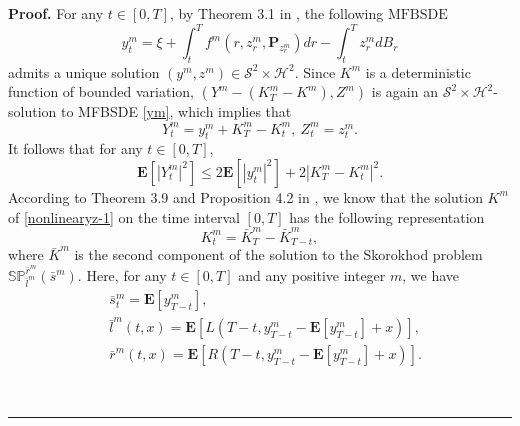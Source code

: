 \documentclass[10pt]{article}%
\numberwithin{equation}{section}
\newenvironment{proof}[1][Proof]{\noindent \textbf{#1.} }{\  \rule{0.5em}{0.5em}}
\def \E{\mathbf{E}}
\def \P{\mathbf{P}}
\begin{document}
\begin{proof}
 For any $t\in[0,T]$, by Theorem 3.1 in \cite{BLP}, the following $\text{MFBSDE}$
 \begin{equation*}\label{ym}
  y_t^m=\xi+\int_{t}^{T} f^m(r,z^m_r,\P_{z^m_r})dr- \int_{t}^{T}z_r^mdB_r 
 \end{equation*}
 admits a unique solution $(y^{m},z^{m})\in \mathcal{S}^2\times\mathcal{H}^2$. 
 Since $K^m$ is a deterministic function of bounded variation, $\left(Y^m-(K^m_{T}-K^m), Z^m\right)$ is again an $\mathcal{S}^2\times\mathcal{H}^2$-solution to MFBSDE \eqref{ym}, which implies that
 \begin{equation}\label{YmZm}
   Y_{t}^{m}=y_{t}^{m}+K_{T}^{m}-K_{t}^{m},\ Z_t^{m}=z_t^{m}.%
 \end{equation}
 It follows that for any $t\in[0,T]$, 
 \begin{equation}\label{Ymym}
  \mathbf{E}[\left|Y_{t}^{m}\right|^2]\leq 2\mathbf{E}[\left|y_{t}^m\right|^2]+2\left|K_{T}^{m}-K_{t}^{m}\right|^2.
  \end{equation}
  According to Theorem 3.9 and Proposition 4.2 in \cite{L}, we know that the solution $K^m$ of \eqref{nonlinearyz-1} on the time interval $[0,T]$ 
has the following representation $$K^m_t=\bar{K}^m_{T}-\bar{K}^m_{T-t},$$ where $\bar{K}^m$ is the second component of the solution to the Skorokhod problem $\mathbb{SP}_{\bar{l}^m}^{\bar{r}^m}(\bar{s}^m)$. Here, for any $t\in[0,T]$ and any positive integer $m$, we have
\begin{equation}\label{smlmrm}\begin{split}
 &\bar{s}^m_{t}=\mathbf{E}[y^m_{T-t}],\\ 
 &\bar{l}^m(t,x)=\E\left[L\left(T-t,y_{T-t}^m-\E[y_{T-t}^m]+x\right)\right], \\ &\bar{r}^m(t,x)=\E\left[R\left(T-t,y_{T-t}^m-\E[y_{T-t}^m]+x\right)\right].   
\end{split}
\end{equation}


\end{proof}
\end{document}
